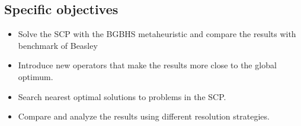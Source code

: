 \subsection{Specific objectives}
\begin{itemize}
\item Solve the SCP with the BGBHS metaheuristic and compare the results with benchmark of Beasley	\cite{citeulike:921349}	
\item Introduce new operators that make the results more close to the global optimum.
\item Search nearest optimal solutions to problems in the SCP.
\item Compare and analyze the results using different resolution strategies.
\end{itemize}




